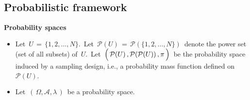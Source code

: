 \clearpage
\subsection{Probabilistic framework}
\label{CalibrationDomainTotalProbabilisticFramework}
\setcounter{theorem}{0}


\noindent
\textbf{Probability spaces}
\begin{itemize}
\item
    Let
    \,$U \,=\, \{1,2,\ldots,N\}$.\,
    Let
    \,$\mathcal{P}(U) \,=\, \mathcal{P}(\{1,2,\ldots,N\})$\,
    denote the power set (set of all subsets) of \,$U$.\,
    Let
    \,$\left(\,\mathcal{P}(U)\,,\mathcal{P}(\mathcal{P}(U))\,,\overset{{\color{white}-}}{\pi}\,\right)$\,
    be the probability space induced by a sampling design, i.e.,
    a probability mass function defined on
    \,$\mathcal{P}(U)$.\,
\item
    Let \,$\left(\,\Omega,\mathscr{A},\lambda\,\right)$\, be a probability space.
\end{itemize}

